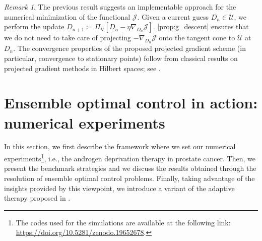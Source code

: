 \documentclass[a4paper,12pt, reqno]{amsart}
\theoremstyle{plain}
\theoremstyle{definition}
\theoremstyle{remark}
\newtheorem{remark}{Remark}
\numberwithin{equation}{section}
\newcommand{\J}{\mathcal{J}}
\newcommand{\U}{\mathcal{U}}
\begin{document}
\begin{remark} \label{rmk:g_descent}
The previous result suggests an implementable approach for the numerical minimization of the functional $\J$.
Given a current guess ${D}_n\in \U$, we perform the update ${D}_{n+1}\coloneqq \Pi_{\U}[{D}_n - \eta\nabla_{{D}_n}\J]$. 
\cref{prop:g_descent} ensures that we do not need to take care of projecting $-\nabla_{{D}_n}\J$ onto the tangent cone to $\U$ at ${D}_n$. {The convergence properties of the proposed projected gradient scheme (in particular, convergence to stationary points) follow from classical results on projected gradient methods in Hilbert spaces; see \cite[Chapter~2]{Bertsekas}.}
\end{remark}



\section{Ensemble optimal control in action: numerical experiments}
\label{sec:experiments}

In this section, we first describe the framework where we set our numerical experiments\footnote{{The codes used for the simulations are available at the following link: \url{https://doi.org/10.5281/zenodo.19652678}.}}, i.e., the androgen deprivation therapy in prostate cancer. 
Then, we present the benchmark strategies and we discuss the results obtained through the resolution of ensemble optimal control problems.
Finally, taking advantage of the insights provided by this viewpoint, we introduce a variant of the adaptive therapy proposed in \cite{moff2009adaptive,moff2017zhang}.
\end{document}
